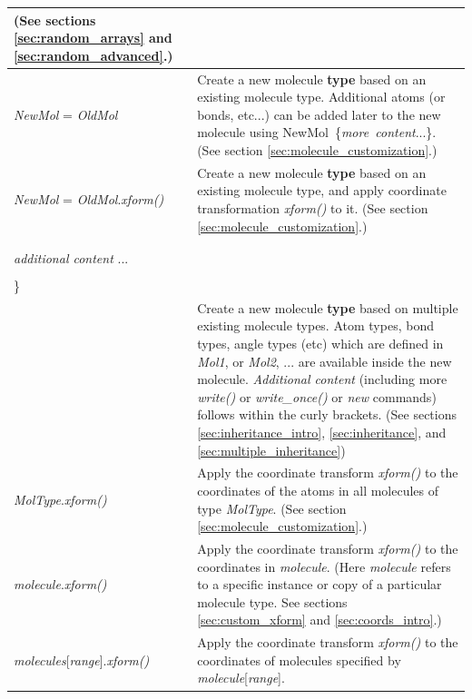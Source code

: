 \documentclass[11pt]{article}
\begin{document}
\begin{longtable}[h]{l|p{9cm}}
(See sections \ref{sec:random_arrays} and \ref{sec:random_advanced}.)
\\
\hline
\textit{NewMol} = \textit{OldMol} &
Create a new molecule \textbf{type} based on an existing molecule type.
Additional atoms (or bonds, etc...) can be added later to the new molecule 
using \mbox{NewMol \{\textit{more\ content}...\}}.  
(See section \ref{sec:molecule_customization}.)
\\
\hline
\textit{NewMol} = \textit{OldMol}.\textit{xform()}
&
Create a new molecule \textbf{type} based on an existing molecule type,
and apply coordinate transformation \textit{xform()} to it.
(See section \ref{sec:molecule_customization}.)
\\
\hline
\begin{tabular}[t]{l}
\textit{NewMol} \textbf{inherits} \textit{Mol1} \textit{Mol2} ... \{ \\
\\
\hspace{0.35cm} \textit{additional content} ... \\
\\
\} \\
\end{tabular}
&
Create a new molecule \textbf{type} based on multiple existing molecule types.
Atom types, bond types, angle types (etc) which are defined in
\textit{Mol1}, or \textit{Mol2}, ... are available inside the
new molecule.
\textit{Additional content} 
(including more \textit{write()} or \textit{write\_once()}
or \textit{new} commands)
follows within the curly brackets.
(See sections \ref{sec:inheritance_intro},
\ref{sec:inheritance}, and \ref{sec:multiple_inheritance})
\\
\hline
\textit{MolType}.\textit{xform()}
&
Apply the coordinate transform \textit{xform()} to the coordinates 
of the atoms in all molecules of type \textit{MolType}.
(See section \ref{sec:molecule_customization}.)
\\
\hline
\textit{molecule}.\textit{xform()}
&
Apply the coordinate transform \textit{xform()} 
to the coordinates in \textit{molecule}.
(Here \textit{molecule} refers to a specific instance or copy of
 a particular molecule type.
See sections \ref{sec:custom_xform} and \ref{sec:coords_intro}.)
\\
\hline
\textit{molecules}[\textit{range}].\textit{xform()}
&
Apply the coordinate transform \textit{xform()} 
to the coordinates of molecules specified by
\mbox{\textit{molecule}[\textit{range}]}.

\end{longtable}
\end{document}
